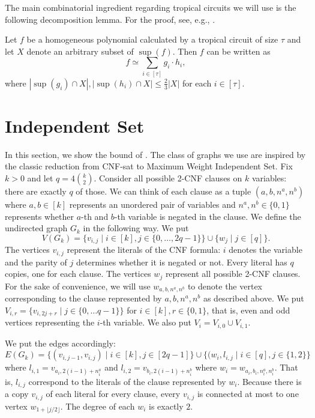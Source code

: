 The main combinatorial ingredient regarding tropical circuits we will use is the following decomposition lemma. For the proof, see, e.g., \cite[Lemma 3.4]{Jukna2023}.
\begin{lemma}\label{lem:tc_decomposition}
    Let $f$ be a homogeneous polynomial calculated by a tropical circuit of size $\tau$ and let $X$ denote an arbitrary subset of $\sup(f)$. Then $f$ can be written as
    $$
        f \simeq \sum_{i \in [\tau]} g_i \cdot h_i,
    $$
    where $|\sup(g_i) \cap X|, |\sup(h_i) \cap X| \leq \frac{2}{3}|X|$ for each $i \in [\tau]$.
\end{lemma}





\section{Independent Set}
\label{sec:mwis}

In this section, we show the bound of . The class of graphs we use are inspired by the classic reduction from CNF-sat to Maximum Weight Independent Set.
Fix $k > 0$ and let $q = 4\binom{k}{2}$. Consider all possible 2-CNF clauses on $k$ variables: there are exactly $q$ of those. We can think of each clause as a tuple $(a, b, n^a, n^b)$ where $a, b \in [k]$ represents an unordered pair of variables and $n^a, n^b \in \{0, 1\}$ represents whether $a$-th and $b$-th variable is negated in the clause. We define the undirected graph $G_k$ in the following way. We put
\begin{equation*}
    V(G_k) = \{v_{i,j} \mid i \in [k], j \in \{0, \dots, 2q - 1\}\} \cup
             \{ w_j \mid j \in [q] \}.
\end{equation*}
The vertices $v_{i,j}$ represent the literals of the CNF formula: $i$ denotes the variable and the parity of $j$ determines whether it is negated or not.
Every literal has $q$ copies, one for each clause. The vertices $w_j$ represent all possible 2-CNF clauses. For the sake of convenience, we will use $w_{a,b,n^a,n^b}$ to denote the vertex corresponding to the clause represented by $a,b,n^a,n^b$ as described above. We put $V_{i,r} = \{ v_{i, 2j + r} \mid j \in \{0, \dots q - 1\} \}$ for $i \in [k], r \in \{0, 1\}$, that is, even and odd vertices representing the $i$-th variable. We also put $V_i = V_{i,0} \cup V_{i,1}$.

We put the edges accordingly:
\begin{equation*}
    E(G_k) = \{ (v_{i,j-1}, v_{i,j}) \mid i \in [k], j \in [2q - 1]\} \cup
             \{ (w_i, l_{i,j} \mid i \in [q], j \in \{1, 2\} \}
\end{equation*}
where $l_{i,1} = v_{a_i, 2(i - 1) + n^a_i}$ and $l_{i,2} = v_{b_i, 2(i - 1) + n^b_i}$ where $w_i = w_{a_i, b_i, n^a_i, n^b_i}$. That is, $l_{i,j}$ correspond to the literals of the clause represented by $w_i$. Because there is a copy $v_{i,j}$ of each literal for every clause, every $v_{i,j}$ is connected at most to one vertex $w_{1 + \lfloor j/2 \rfloor}$. The degree of each $w_i$ is exactly $2$.

